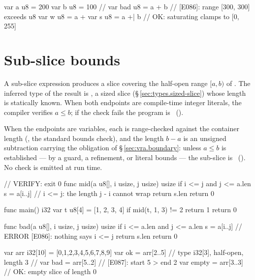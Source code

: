 \begin{example}
\begin{laincode}
var a u8 = 200
var b u8 = 100
// var bad u8 = a + b      // [E086]: range [300, 300] exceeds u8
var w u8 = a +%
var s u8 = a +| b           // OK: saturating clamps to [0, 255]
\end{laincode}
\end{example}

\section{Sub-slice bounds}
\label{sec:vra.subslice}

\pnum
A sub-slice expression  produces a slice covering the
half-open range $[a, b)$ of .  The inferred type of the
result is , a sized slice
(\S\,\ref{sec:types.sized-slice}) whose length is statically known.
When both endpoints are compile-time integer literals, the compiler
verifies $a \leq b$; if the check fails the program is
\illformed{}~().

\pnum
When the endpoints are variables, each is range-checked against the
container length (, the standard bounds check), and the
length $b - a$ is an unsigned subtraction carrying the obligation of
\S\,\ref{sec:vra.boundary}: unless $a \leq b$ is established --- by a guard,
a refinement, or literal bounds --- the sub-slice is
\illformed{}~().  No check is emitted at run time.

\begin{laincode}
// VERIFY: exit 0
func mid(a u8[], i usize, j usize) usize {
    if i <= j and j <= a.len {
        s = a[i..j]               // i <= j: the length j - i cannot wrap
        return s.len
    }
    return 0
}

func main() i32 {
    var t u8[4] = [1, 2, 3, 4]
    if mid(t, 1, 3) != 2 { return 1 }
    return 0
}
\end{laincode}

\begin{laincode}
func bad(a u8[], i usize, j usize) usize {
    if i <= a.len and j <= a.len {
        s = a[i..j]               // ERROR [E086]: nothing says i <= j
        return s.len
    }
    return 0
}
\end{laincode}

\begin{example}
\begin{laincode}
var arr i32[10] = [0,1,2,3,4,5,6,7,8,9]
var ok  = arr[2..5]    // type i32[3], half-open, length 3
// var bad = arr[5..2] // [E087]: start 5 > end 2
var empty = arr[3..3]  // OK: empty slice of length 0
\end{laincode}
\end{example}

